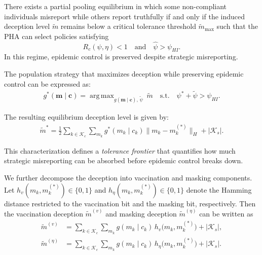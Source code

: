 \documentclass[sigconf,review]{acmart}
\DeclareMathOperator*{\argmax}{arg\,max}
\newcommand{\abs}[1]{\left| #1 \right|}
\begin{document}
\begin{theorem}
\label{thm:partial}
There exists a partial pooling equilibrium in which some non-compliant individuals misreport while others report truthfully if and only if the induced deception level $\tilde{m}$ remains below a critical tolerance threshold $\tilde{m}_{\max}$ such that the PHA can select policies satisfying
\[
R_c(\psi,\eta) < 1 \quad \text{and} \quad \widehat{\psi} > \psi_{HI}.
\]
In this regime, epidemic control is preserved despite strategic misreporting.
\end{theorem}

The population strategy that maximizes deception while preserving epidemic control can be expressed as:
\begin{equation}
\begin{aligned}
g^{\ast}(\boldsymbol{m}\mid \boldsymbol{c})
= \argmax_{g(\boldsymbol{m}\mid\boldsymbol{c}),\,\tilde{\psi}} \ \tilde{m}
\quad
\text{s.t.}\quad
\psi^{\ast} + \tilde{\psi} > \psi_{HI}.
\end{aligned}
\end{equation}

The resulting equilibrium deception level is given by:
\begin{equation}
\begin{aligned}
\tilde{m}^{\ast}
=
\frac{1}{2}\sum_{k\in \mathcal{K}_c}\sum_{m_k} g^{\ast}(m_k\mid c_k)\lVert m_k-m_k^{(\ast)} \rVert_H
+ |\mathcal{K}_s|.
\end{aligned}
\end{equation}

This characterization defines a \emph{tolerance frontier} that quantifies how much strategic misreporting can be absorbed before epidemic control breaks down.

We further decompose the deception into vaccination and masking components.
Let $h_v(m_k,m_k^{(*)}) \in \{0,1\}$ and $h_\eta(m_k,m_k^{(*)}) \in \{0,1\}$
denote the Hamming distance restricted to the vaccination bit and the
masking bit, respectively. Then the vaccination deception $\tilde{m}^{(v)}$
and masking deception $\tilde{m}^{(\eta)}$ can be written as
\begin{align}
\tilde{m}^{(v)}
  &= \sum_{k \in \mathcal{K}_c} \sum_{m_k} g(m_k \mid c_k)\,
     h_v\!\bigl(m_k, m_k^{(*)}\bigr)
     + \abs{\mathcal{K}_s}, \label{eq:vax-deception} \\[4pt]
\tilde{m}^{(\eta)}
  &= \sum_{k \in \mathcal{K}_c} \sum_{m_k} g(m_k \mid c_k)\,
     h_\eta\!\bigl(m_k, m_k^{(*)}\bigr)
     + \abs{\mathcal{K}_s}. \label{eq:mask-deception}
\end{align}
\end{document}
